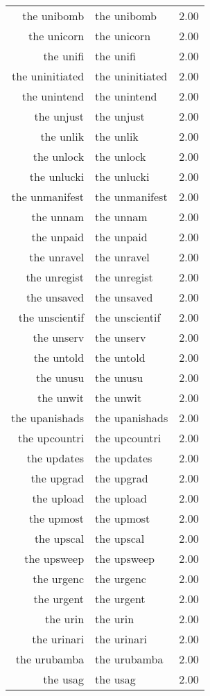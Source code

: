 \begin{table}[ht]
\begin{tabular}{rlr}
  the unibomb & the unibomb & 2.00 \\ 
  the unicorn & the unicorn & 2.00 \\ 
  the unifi & the unifi & 2.00 \\ 
  the uninitiated & the uninitiated & 2.00 \\ 
  the unintend & the unintend & 2.00 \\ 
  the unjust & the unjust & 2.00 \\ 
  the unlik & the unlik & 2.00 \\ 
  the unlock & the unlock & 2.00 \\ 
  the unlucki & the unlucki & 2.00 \\ 
  the unmanifest & the unmanifest & 2.00 \\ 
  the unnam & the unnam & 2.00 \\ 
  the unpaid & the unpaid & 2.00 \\ 
  the unravel & the unravel & 2.00 \\ 
  the unregist & the unregist & 2.00 \\ 
  the unsaved & the unsaved & 2.00 \\ 
  the unscientif & the unscientif & 2.00 \\ 
  the unserv & the unserv & 2.00 \\ 
  the untold & the untold & 2.00 \\ 
  the unusu & the unusu & 2.00 \\ 
  the unwit & the unwit & 2.00 \\ 
  the upanishads & the upanishads & 2.00 \\ 
  the upcountri & the upcountri & 2.00 \\ 
  the updates & the updates & 2.00 \\ 
  the upgrad & the upgrad & 2.00 \\ 
  the upload & the upload & 2.00 \\ 
  the upmost & the upmost & 2.00 \\ 
  the upscal & the upscal & 2.00 \\ 
  the upsweep & the upsweep & 2.00 \\ 
  the urgenc & the urgenc & 2.00 \\ 
  the urgent & the urgent & 2.00 \\ 
  the urin & the urin & 2.00 \\ 
  the urinari & the urinari & 2.00 \\ 
  the urubamba & the urubamba & 2.00 \\ 
  the usag & the usag & 2.00 \\ 

\end{tabular}
\end{table}
